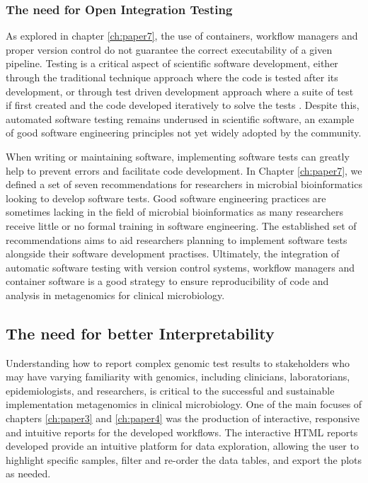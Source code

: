 \subsubsection{The need for Open Integration Testing }

As explored in chapter \ref{ch:paper7}, the use of containers, workflow managers and proper version control do not guarantee the correct executability of a given pipeline. Testing is a critical aspect of scientific software development, either through the traditional technique approach where the code is tested after its development, or through test driven development approach where a suite of test if first created and the code developed iteratively to solve the tests \citep{krafczyk_scientific_2019}. Despite this, automated software testing remains underused in scientific software, an example of good software engineering principles not yet widely adopted by the community. 

When writing or maintaining software, implementing software tests can greatly help to prevent errors and facilitate code development. In Chapter \ref{ch:paper7}, we defined a set of seven recommendations for researchers in microbial bioinformatics looking to develop software tests. Good software engineering practices are sometimes lacking in the field of microbial bioinformatics as many researchers receive little or no formal training in software engineering. The established set of recommendations aims to aid researchers planning to implement software tests alongside their software development practises. Ultimately, the integration of automatic software testing with version control systems, workflow managers and container software is a good strategy to ensure reproducibility of code and analysis in metagenomics for clinical microbiology. 

\subsection{The need for better Interpretability}

Understanding how to report complex genomic test results to stakeholders who may have varying familiarity with genomics, including clinicians, laboratorians, epidemiologists, and researchers, is critical to the successful and sustainable implementation metagenomics in clinical microbiology. One of the main focuses of chapters \ref{ch:paper3} and \ref{ch:paper4} was the production of interactive, responsive and intuitive reports for the developed workflows. The interactive HTML reports developed provide an intuitive platform for data exploration, allowing the user to highlight specific samples, filter and re-order the data tables, and export the plots as needed. 

